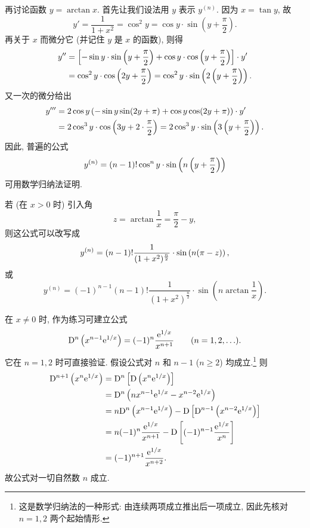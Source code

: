 \label{ex:higher_derivative_arctangent}
再讨论函数 $y = \arctan x$.
首先让我们设法用 $y$ 表示 $y^{(n)}$.
因为 $x = \tan y$, 故
$$
y' = \frac{1}{1 + x^2} = \cos^2 y = \cos y \cdot \sin \left( y + \frac{\pi}{2} \right).
$$
再关于 $x$ 而微分它 (并记住 $y$ 是 $x$ 的函数), 则得
\begin{align*}
    y'' &= \left[ -\sin y \cdot \sin \left( y + \frac{\pi}{2} \right) + \cos y \cdot \cos \left( y + \frac{\pi}{2} \right) \right] \cdot y' \\
    &= \cos^2 y \cdot \cos \left( 2y + \frac{\pi}{2} \right) = \cos^2 y \cdot \sin\left(2\left( y+\frac\pi2 \right)\right).
\end{align*}
又一次的微分给出
\begin{align*}
    y''' &= 2\cos y\left( -\sin y\sin(2y+\pi)+\cos y\cos(2y+\pi) \right) \cdot y' \\
    &= 2 \cos^3 y \cdot \cos \left( 3y + 2 \cdot \frac{\pi}{2} \right) = 2 \cos^3 y \cdot \sin\left(3\left( y+\frac\pi2 \right)\right).
\end{align*}
因此, 普遍的公式
$$
y^{(n)} = (n - 1)! \cos^n y \cdot \sin\left(n\left( y+\frac\pi2 \right)\right)
$$
可用数学归纳法证明.

若 (在 $x > 0$ 时) 引入角
$$
z = \arctan \frac{1}{x} = \frac{\pi}{2} - y,
$$
则这公式可以改写成
$$
y^{(n)} = (n-1)! \frac{1}{(1+x^2)^{\frac{n}{2}}} \cdot \sin\left( n(\pi-z) \right),
$$
或
$$
y^{(n)} = (-1)^{n-1}(n-1)! \frac{1}{(1+x^2)^{\frac{n}{2}}} \cdot \sin\left(n\arctan\frac1x\right).
$$

\label{ex:higher_derivative_exponential_reciprocal}
在 $x\neq0$ 时, 作为练习可建立公式
\label{eq:exponential_reciprocal_higher_derivative}
$$
    \mathrm{D}^n\left(x^{n-1}\mathrm{e}^{1/x}\right)
    =(-1)^n\frac{\mathrm{e}^{1/x}}{x^{n+1}}
    \qquad(n=1,2,\ldots).
$$
它在 $n=1,2$ 时可直接验证. 假设公式对 $n$ 和 $n-1$ ($n\geq2$) 均成立.\footnote{这是数学归纳法的一种形式: 由连续两项成立推出后一项成立, 因此先核对 $n=1,2$ 两个起始情形.} 则
$$
\begin{aligned}
    \mathrm{D}^{n+1}\left(x^n\mathrm{e}^{1/x}\right)
    &=\mathrm{D}^n\left[\mathrm{D}\left(x^n\mathrm{e}^{1/x}\right)\right]\\
    &=\mathrm{D}^n\left(nx^{n-1}\mathrm{e}^{1/x}-x^{n-2}\mathrm{e}^{1/x}\right)\\
    &=n\mathrm{D}^n\left(x^{n-1}\mathrm{e}^{1/x}\right)
      -\mathrm{D}\left[\mathrm{D}^{n-1}\left(x^{n-2}\mathrm{e}^{1/x}\right)\right]\\
    &=n(-1)^n\frac{\mathrm{e}^{1/x}}{x^{n+1}}
      -\mathrm{D}\left[(-1)^{n-1}\frac{\mathrm{e}^{1/x}}{x^n}\right]\\
    &=(-1)^{n+1}\frac{\mathrm{e}^{1/x}}{x^{n+2}}.
\end{aligned}
$$
故公式对一切自然数 $n$ 成立.

